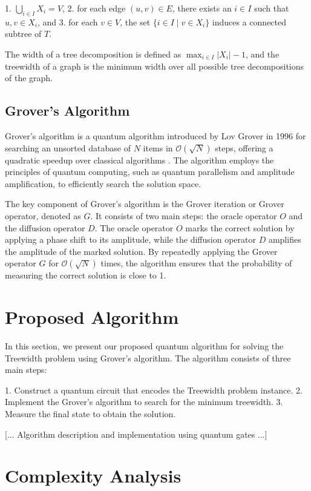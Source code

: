 1. $\bigcup_{i \in I} X_i = V$,
2. for each edge $(u, v) \in E$, there exists an $i \in I$ such that $u, v \in X_i$, and
3. for each $v \in V$, the set $\{i \in I \mid v \in X_i\}$ induces a connected subtree of $T$.

The width of a tree decomposition is defined as $\max_{i \in I} \lvert X_i \rvert - 1$, and the treewidth of a graph is the minimum width over all possible tree decompositions of the graph.

\subsection{Grover's Algorithm}

Grover's algorithm is a quantum algorithm introduced by Lov Grover in 1996 for searching an unsorted database of $N$ items in $\mathcal{O}(\sqrt{N})$ steps, offering a quadratic speedup over classical algorithms \cite{grover1996}. The algorithm employs the principles of quantum computing, such as quantum parallelism and amplitude amplification, to efficiently search the solution space.

The key component of Grover's algorithm is the Grover iteration or Grover operator, denoted as $G$. It consists of two main steps: the oracle operator $O$ and the diffusion operator $D$. The oracle operator $O$ marks the correct solution by applying a phase shift to its amplitude, while the diffusion operator $D$ amplifies the amplitude of the marked solution. By repeatedly applying the Grover operator $G$ for $\mathcal{O}(\sqrt{N})$ times, the algorithm ensures that the probability of measuring the correct solution is close to 1.

\section{Proposed Algorithm} \label{sec:algorithm}

In this section, we present our proposed quantum algorithm for solving the Treewidth problem using Grover's algorithm. The algorithm consists of three main steps:

1. Construct a quantum circuit that encodes the Treewidth problem instance.
2. Implement the Grover's algorithm to search for the minimum treewidth.
3. Measure the final state to obtain the solution.

[... Algorithm description and implementation using quantum gates ...]

\section{Complexity Analysis} \label{sec:analysis}


